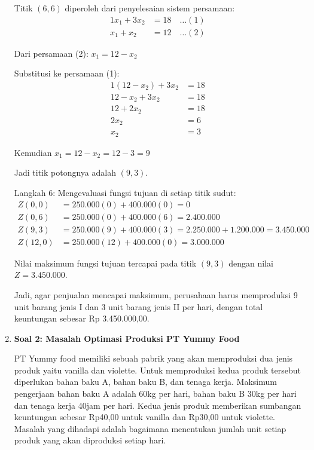 \documentclass[12pt,a4paper]{article}
\begin{document}
\begin{enumerate}
    Titik $(6,6)$ diperoleh dari penyelesaian sistem persamaan:
    \begin{align*}
    1x_1 + 3x_2 &= 18 \quad \ldots (1) \\
    x_1 + x_2 &= 12 \quad \ldots (2)
    \end{align*}
    
    Dari persamaan (2): $x_1 = 12 - x_2$
    
    Substitusi ke persamaan (1):
    \begin{align*}
    1(12 - x_2) + 3x_2 &= 18 \\
    12 - x_2 + 3x_2 &= 18 \\
    12 + 2x_2 &= 18 \\
    2x_2 &= 6 \\
    x_2 &= 3
    \end{align*}
    
    Kemudian $x_1 = 12 - x_2 = 12 - 3 = 9$
    
    Jadi titik potongnya adalah $(9,3)$.
    
    Langkah 6: Mengevaluasi fungsi tujuan di setiap titik sudut:
    \begin{align*}
    Z(0,0) &= 250.000(0) + 400.000(0) = 0 \\
    Z(0,6) &= 250.000(0) + 400.000(6) = 2.400.000 \\
    Z(9,3) &= 250.000(9) + 400.000(3) = 2.250.000 + 1.200.000 = 3.450.000 \\
    Z(12,0) &= 250.000(12) + 400.000(0) = 3.000.000
    \end{align*}
    
    Nilai maksimum fungsi tujuan tercapai pada titik $(9,3)$ dengan nilai $Z = 3.450.000$.
    
    Jadi, agar penjualan mencapai maksimum, perusahaan harus memproduksi 9 unit barang jenis I dan 3 unit barang jenis II per hari, dengan total keuntungan sebesar Rp 3.450.000,00.
    
    \item \textbf{Soal 2: Masalah Optimasi Produksi PT Yummy Food}
    
    PT Yummy food memiliki sebuah pabrik yang akan memproduksi dua jenis produk yaitu vanilla dan violette. Untuk memproduksi kedua produk tersebut diperlukan bahan baku A, bahan baku B, dan tenaga kerja. Maksimum pengerjaan bahan baku A adalah 60kg per hari, bahan baku B 30kg per hari dan tenaga kerja 40jam per hari. Kedua jenis produk memberikan sumbangan keuntungan sebesar Rp40,00 untuk vanilla dan Rp30,00 untuk violette. Masalah yang dihadapi adalah bagaimana menentukan jumlah unit setiap produk yang akan diproduksi setiap hari.
    

\end{enumerate}
\end{document}
